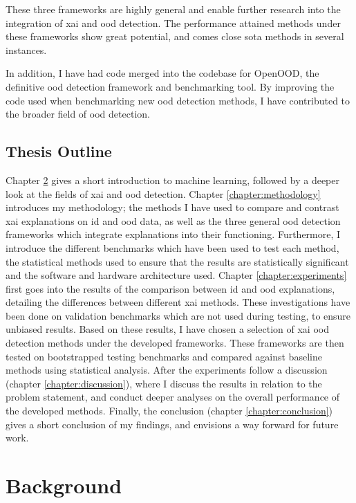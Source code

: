 \documentclass[UKenglish]{uiomasterthesis} %
\theoremstyle{definition}
\begin{document}
These three frameworks are highly general and enable further research into the integration of \ac{xai} and \ac{ood} detection. The performance attained methods under these frameworks show great potential, and comes close \ac{sota} methods in several instances.

In addition, I have had code merged into the codebase for OpenOOD, the definitive \ac{ood} detection framework and benchmarking tool. By improving the code used when benchmarking new \ac{ood} detection methods, I have contributed to the broader field of \ac{ood} detection.

\section{Thesis Outline}

Chapter \ref{chapter:background} gives a short introduction to machine learning, followed by a deeper look at the fields of \ac{xai} and \ac{ood} detection. Chapter \ref{chapter:methodology} introduces my methodology; the methods I have used to compare and contrast \ac{xai} explanations on \ac{id} and \ac{ood} data, as well as the three general \ac{ood} detection frameworks which integrate explanations into their functioning. Furthermore, I introduce the different benchmarks which have been used to test each method, the statistical methods used to ensure that the results are statistically significant and the software and hardware architecture used. Chapter \ref{chapter:experiments} first goes into the results of the comparison between \ac{id} and \ac{ood} explanations, detailing the differences between different \ac{xai} methods. These investigations have been done on validation benchmarks which are not used during testing, to ensure unbiased results. Based on these results, I have chosen a selection of \ac{xai} \ac{ood} detection methods under the developed frameworks. These frameworks are then tested on bootstrapped testing benchmarks and compared against baseline methods using statistical analysis. After the experiments follow a discussion (chapter \ref{chapter:discussion}), where I discuss the results in relation to the problem statement, and conduct deeper analyses on the overall performance of the developed methods. Finally, the conclusion (chapter \ref{chapter:conclusion}) gives a short conclusion of my findings, and envisions a way forward for future work.

\chapter{Background} \label{chapter:background}
\end{document}

